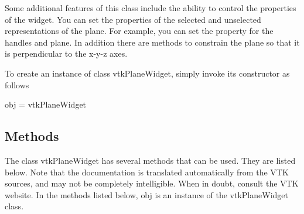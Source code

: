 Some additional features of this class include the ability to control the properties of the widget. You can set the properties of the selected and unselected representations of the plane. For example, you can set the property for the handles and plane. In addition there are methods to constrain the plane so that it is perpendicular to the x-\/y-\/z axes.

To create an instance of class vtk\-Plane\-Widget, simply invoke its constructor as follows \begin{DoxyVerb}  obj = vtkPlaneWidget
\end{DoxyVerb}
 \hypertarget{vtkwidgets_vtkxyplotwidget_Methods}{}\subsection{Methods}\label{vtkwidgets_vtkxyplotwidget_Methods}
The class vtk\-Plane\-Widget has several methods that can be used. They are listed below. Note that the documentation is translated automatically from the V\-T\-K sources, and may not be completely intelligible. When in doubt, consult the V\-T\-K website. In the methods listed below, {\ttfamily obj} is an instance of the vtk\-Plane\-Widget class. 
